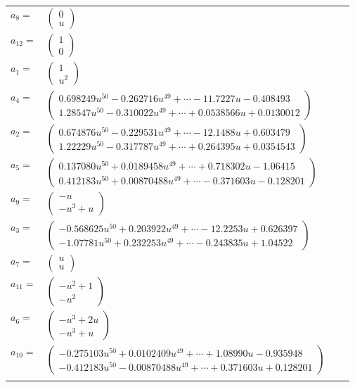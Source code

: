 \documentclass[1p]{elsarticle_modified}
\theoremstyle{definition}
\begin{document}
\begin{tabular}{m{7pt} m{180pt} m{7pt} m{180pt} }
\flushright $a_{8}=$&$\begin{pmatrix}0\\u\end{pmatrix}$ \\
\flushright $a_{12}=$&$\begin{pmatrix}1\\0\end{pmatrix}$ \\
\flushright $a_{1}=$&$\begin{pmatrix}1\\u^2\end{pmatrix}$ \\
\flushright $a_{4}=$&$\begin{pmatrix}0.698249 u^{50}-0.262716 u^{49}+\cdots-11.7227 u-0.408493\\1.28547 u^{50}-0.310022 u^{49}+\cdots+0.0538566 u+0.0130012\end{pmatrix}$ \\
\flushright $a_{2}=$&$\begin{pmatrix}0.674876 u^{50}-0.229531 u^{49}+\cdots-12.1488 u+0.603479\\1.22229 u^{50}-0.317787 u^{49}+\cdots+0.264395 u+0.0354543\end{pmatrix}$ \\
\flushright $a_{5}=$&$\begin{pmatrix}0.137080 u^{50}+0.0189458 u^{49}+\cdots+0.718302 u-1.06415\\0.412183 u^{50}+0.00870488 u^{49}+\cdots-0.371603 u-0.128201\end{pmatrix}$ \\
\flushright $a_{9}=$&$\begin{pmatrix}- u\\- u^3+u\end{pmatrix}$ \\
\flushright $a_{3}=$&$\begin{pmatrix}-0.568625 u^{50}+0.203922 u^{49}+\cdots-12.2253 u+0.626397\\-1.07781 u^{50}+0.232253 u^{49}+\cdots-0.243835 u+1.04522\end{pmatrix}$ \\
\flushright $a_{7}=$&$\begin{pmatrix}u\\u\end{pmatrix}$ \\
\flushright $a_{11}=$&$\begin{pmatrix}- u^2+1\\- u^2\end{pmatrix}$ \\
\flushright $a_{6}=$&$\begin{pmatrix}- u^3+2 u\\- u^3+u\end{pmatrix}$ \\
\flushright $a_{10}=$&$\begin{pmatrix}-0.275103 u^{50}+0.0102409 u^{49}+\cdots+1.08990 u-0.935948\\-0.412183 u^{50}-0.00870488 u^{49}+\cdots+0.371603 u+0.128201\end{pmatrix}$\\&\end{tabular}
\end{document}

